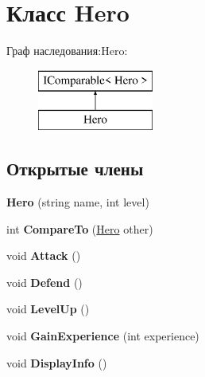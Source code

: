 \hypertarget{class_hero}{}\section{Класс Hero}
\label{class_hero}
Граф наследования\+:Hero\+:\begin{figure}[H]
\begin{center}
\leavevmode
\includegraphics[height=2.000000cm]{class_hero}
\end{center}
\end{figure}
\subsection*{Открытые члены}
\begin{DoxyCompactItemize}
\item 
\mbox{\label{class_hero_a85263cec7e8aabec935235b654a8dc1d}} 
{\bfseries Hero} (string name, int level)
\item 
\mbox{\label{class_hero_a970d338ead03e94305770e039a0d1044}} 
int {\bfseries Compare\+To} (\mbox{\hyperlink{class_hero}{Hero}} other)
\item 
\mbox{\label{class_hero_add924381f82f8c5fd9c6abf46b9fac8e}} 
void {\bfseries Attack} ()
\item 
\mbox{\label{class_hero_a40c63a9f068f6fceca81edbcf243868f}} 
void {\bfseries Defend} ()
\item 
\mbox{\label{class_hero_af173b221c0d4c5b0e6bac9783ab834e0}} 
void {\bfseries Level\+Up} ()
\item 
\mbox{\label{class_hero_a8474afa1cc7f3fc161af8c5aff8570d6}} 
void {\bfseries Gain\+Experience} (int experience)
\item 
\mbox{\label{class_hero_ab1f5d953931fd2e30ad54a97bb53a694}} 
void {\bfseries Display\+Info} ()
\end{DoxyCompactItemize}
